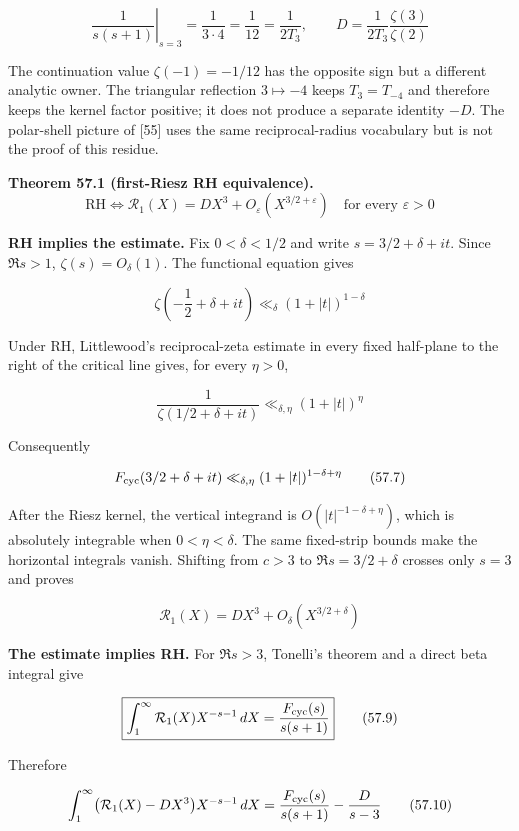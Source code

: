 \documentclass[
  11pt,
]{book}
\renewenvironment{quote}
  {\begin{tcolorbox}[
      enhanced,
      breakable,
      colback=tncream,
      colframe=tnrust,
      boxrule=0.8pt,
      arc=1.5pt,
      left=7pt,
      right=7pt,
      top=6pt,
      bottom=6pt]}
  {\end{tcolorbox}}
\begin{document}
\[
\boxed{
\left.\frac1{s(s+1)}\right|_{s=3}
=\frac1{3\cdot4}=\frac1{12}=\frac1{2T_3},\qquad
D=\frac1{2T_3}\frac{\zeta(3)}{\zeta(2)}}
\tag{57.3a}
\]

The continuation value \(\zeta(-1)=-1/12\) has the opposite sign but a
different analytic owner. The triangular reflection \(3\mapsto-4\) keeps
\(T_3=T_{-4}\) and therefore keeps the kernel factor positive; it does
not produce a separate identity \(-D\). The polar-shell picture of
{[}55{]} uses the same reciprocal-radius vocabulary but is not the proof
of this residue.

\begin{quote}
\textbf{Theorem 57.1 (first-Riesz RH equivalence).} \[
\boxed{
\mathrm{RH}
\iff
\mathcal R_1(X)
=DX^3+O_\varepsilon(X^{3/2+\varepsilon})
\quad\text{for every }\varepsilon>0}
\tag{57.4}
\]
\end{quote}

\textbf{RH implies the estimate.} Fix \(0<\delta<1/2\) and write
\(s=3/2+\delta+it\). Since \(\Re s>1\), \(\zeta(s)=O_\delta(1)\). The
functional equation gives

\[
\zeta\!\left(-\frac12+\delta+it\right)
\ll_\delta(1+|t|)^{1-\delta}
\tag{57.5}
\]

Under RH, Littlewood's reciprocal-zeta estimate in every fixed
half-plane to the right of the critical line gives, for every
\(\eta>0\),

\[
\frac1{\zeta(1/2+\delta+it)}
\ll_{\delta,\eta}(1+|t|)^\eta
\tag{57.6}
\]

Consequently

\[
F_{\rm cyc}(3/2+\delta+it)
\ll_{\delta,\eta}(1+|t|)^{1-\delta+\eta}
\tag{57.7}
\]

After the Riesz kernel, the vertical integrand is
\(O(|t|^{-1-\delta+\eta})\), which is absolutely integrable when
\(0<\eta<\delta\). The same fixed-strip bounds make the horizontal
integrals vanish. Shifting from \(c>3\) to \(\Re s=3/2+\delta\) crosses
only \(s=3\) and proves

\[
\mathcal R_1(X)
=DX^3+O_\delta(X^{3/2+\delta})
\tag{57.8}
\]

\textbf{The estimate implies RH.} For \(\Re s>3\), Tonelli's theorem and
a direct beta integral give

\[
\boxed{
\int_1^\infty\mathcal R_1(X)X^{-s-1}\,dX
=\frac{F_{\rm cyc}(s)}{s(s+1)}}
\tag{57.9}
\]

Therefore

\[
\int_1^\infty
\bigl(\mathcal R_1(X)-DX^3\bigr)X^{-s-1}\,dX
=\frac{F_{\rm cyc}(s)}{s(s+1)}-\frac{D}{s-3}
\tag{57.10}
\]
\end{document}
